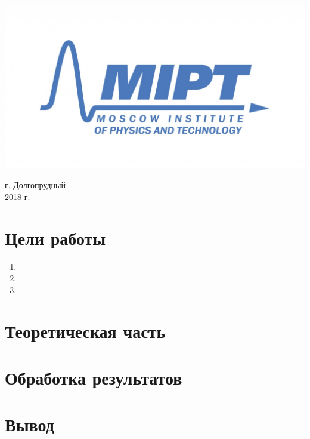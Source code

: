 \documentclass[a4paper, 12pt]{article}
\newenvironment{bottompar}{\par\vspace*{\fill}}{\clearpage}
\begin{document}
\begin{titlepage}
\begin{bottompar}
	\begin{center}
		\includegraphics[width = 80 mm]{logo.jpg}
	\end{center}
	{\large г. Долгопрудный\\2018 г.}

\end{bottompar}
\vfill %

\end{titlepage}

\setcounter{page}{2}

\newpage
\section{Цели работы}
	\begin{enumerate}
	
		\item 
		
		\item 
		
		\item 
	
	\end{enumerate}
	
\section{Теоретическая часть}


\newpage
\section{Обработка результатов}


\begin{figure}[h]
	\centering
	\caption{}
\end{figure}
\newpage

\begin{figure}[t]
	\centering
	\caption{}
\end{figure}

\begin{figure}[h!]
	\centering
	\caption{}
\end{figure}

\newpage
\section{Вывод}
\end{document}
